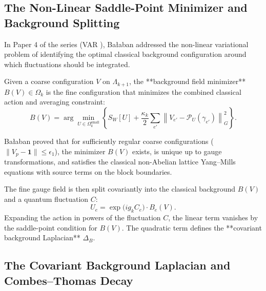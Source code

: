 \subsection{The Non-Linear Saddle-Point Minimizer and Background Splitting}
\label{subsec:var_minimizer_splitting}

In Paper 4 of the series (VAR \cite{Balaban1985c}), Ba\l aban addressed the non-linear variational problem of identifying the optimal classical background configuration around which fluctuations should be integrated.

Given a coarse configuration $V$ on $\Lambda_{k+1}$, the **background field minimizer** $B(V) \in \Omega_k$ is the fine configuration that minimizes the combined classical action and averaging constraint:
\begin{equation}
\label{eq:ch12_variational_minimizer}
B(V) = \arg\min_{U \in \Omega_k^{\mathrm{small}}} \left\{ S_W[U] + \frac{\kappa_k}{2} \sum_{e'} \left\| V_{e'} - \mathcal{P}_U(\gamma_{e'}) \right\|_G^2 \right\}.
\end{equation}

Ba\l aban proved that for sufficiently regular coarse configurations ($\|V_p - \mathbf{1}\| \le \epsilon_1$), the minimizer $B(V)$ exists, is unique up to gauge transformations, and satisfies the classical non-Abelian lattice Yang--Mills equations with source terms on the block boundaries.

The fine gauge field is then split covariantly into the classical background $B(V)$ and a quantum fluctuation $C$:
\begin{equation}
\label{eq:ch12_background_splitting}
U_e = \exp\bigl( i g_k C_e \bigr) \cdot B_e(V).
\end{equation}
Expanding the action in powers of the fluctuation $C$, the linear term vanishes by the saddle-point condition for $B(V)$. The quadratic term defines the **covariant background Laplacian** $\Delta_B$.

\subsection{The Covariant Background Laplacian and Combes--Thomas Decay}
\label{subsec:cov_laplacian_combes_thomas}

